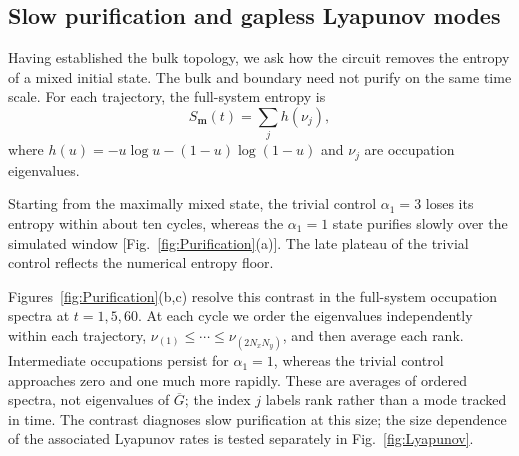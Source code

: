 \documentclass[aps,prb,10pt,twocolumn,superscriptaddress,longbibliography,floatfix]{revtex4-2}
\newcommand{\rec}{\mathbf m}   %
\begin{document}
{\color{blue}
\subsection{Slow purification and gapless Lyapunov modes}
\label{sec:Purification}

Having established the bulk topology, we ask how the circuit removes the entropy of a mixed initial state. The bulk and boundary need not purify on the same time scale. For each trajectory, the full-system entropy is
\begin{equation}
 S_{\rec}(t)=\sum_j h(\nu_j),
 \label{eq:BinaryEntropy}
\end{equation}
where $h(u)=-u\log u-(1-u)\log(1-u)$ and $\nu_j$ are occupation eigenvalues.

Starting from the maximally mixed state, the trivial control $\alpha_1=3$ loses its entropy within about ten cycles, whereas the $\alpha_1=1$ state purifies slowly over the simulated window [Fig.~\ref{fig:Purification}(a)]. The late plateau of the trivial control reflects the numerical entropy floor.

Figures~\ref{fig:Purification}(b,c) resolve this contrast in the full-system occupation spectra at $t=1,5,60$. At each cycle we order the eigenvalues independently within each trajectory, $\nu_{(1)}\leq\cdots\leq\nu_{(2N_xN_y)}$, and then average each rank. Intermediate occupations persist for $\alpha_1=1$, whereas the trivial control approaches zero and one much more rapidly. These are averages of ordered spectra, not eigenvalues of $\overline G$; the index $j$ labels rank rather than a mode tracked in time. The contrast diagnoses slow purification at this size; the size dependence of the associated Lyapunov rates is tested separately in Fig.~\ref{fig:Lyapunov}.


}
\end{document}
